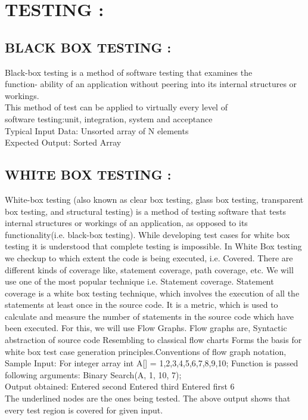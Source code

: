 \documentclass[10pt,a4paper]{article}
\begin{document}
\section{TESTING :}
			
			\subsection{BLACK BOX TESTING : }
			Black-box testing is a method of software testing that examines the\\ function- ability of an application without peering into its internal structures or workings.\\
			This method of test can be applied to virtually every level of\\ software testing:unit, integration, system and acceptance\\
			Typical Input Data:  Unsorted array of N elements \\
			Expected Output:     Sorted Array\\
			
			\subsection{WHITE BOX TESTING : }
			White-box testing (also known as clear box testing, glass box testing, transparent box testing, and structural testing) is a method of testing software that tests internal structures or workings of an application, as opposed to its functionality(i.e. black-box testing). While developing 
			test cases for white box testing it is understood that complete testing 
			is impossible. In White Box testing we checkup to which extent the code 
			is being executed, i.e. Covered. There are different kinds of coverage like, statement coverage, path coverage, etc. We will use one of the most popular technique i.e. Statement coverage. Statement coverage is a white box testing technique, which involves the execution of all the statements at least once in the source code. It is a metric, which is used to calculate and measure the number of statements in the source code which have been executed. For this, we will use Flow Graphs. Flow graphs are, Syntactic abstraction of source code Resembling to classical flow charts Forms the basis for white box test case generation principles.Conventions of flow graph notation, \\
			Sample Input: For integer array int A[] = 1,2,3,4,5,6,7,8,9,10; Function 
			is passed\\
			following arguments: Binary Search(A, 1, 10, 7);\\
			Output obtained: Entered second Entered third Entered first 6\\
			The underlined nodes are the ones being tested. The above output shows
			that every test region is covered for given input.\\
			
\end{document}
